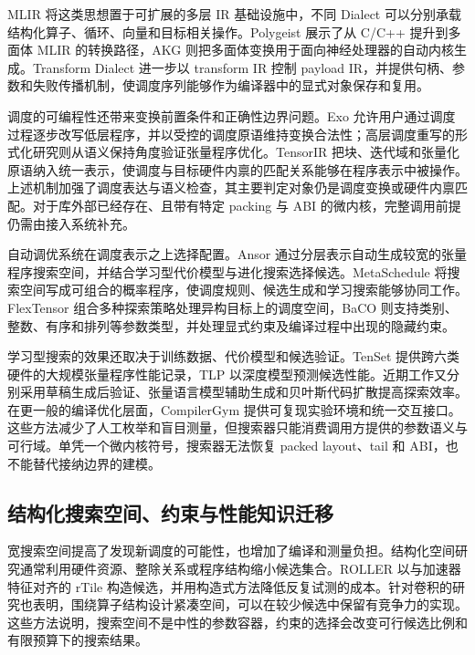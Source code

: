 MLIR 将这类思想置于可扩展的多层 IR 基础设施中，不同 Dialect 可以分别承载结构化算子、循环、向量和目标相关操作\cite{Lattner2021MLIR,Lattner2020MLIR}。Polygeist 展示了从 C/C++ 提升到多面体 MLIR 的转换路径\cite{Moses2021Polygeist}，AKG 则把多面体变换用于面向神经处理器的自动内核生成\cite{Zhao2021AKG}。Transform Dialect 进一步以 transform IR 控制 payload IR，并提供句柄、参数和失败传播机制，使调度序列能够作为编译器中的显式对象保存和复用\cite{LLVMProjectTransformDialect,Luecke2025TransformDialect}。

调度的可编程性还带来变换前置条件和正确性边界问题。Exo 允许用户通过调度过程逐步改写低层程序，并以受控的调度原语维持变换合法性\cite{Ikarashi2022Exocompilation}；高层调度重写的形式化研究则从语义保持角度验证张量程序优化\cite{Liu2022VerifiedScheduling}。TensorIR 把块、迭代域和张量化原语纳入统一表示，使调度与目标硬件内禀的匹配关系能够在程序表示中被操作\cite{Feng2023TensorIR}。上述机制加强了调度表达与语义检查，其主要判定对象仍是调度变换或硬件内禀匹配。对于库外部已经存在、且带有特定 packing 与 ABI 的微内核，完整调用前提仍需由接入系统补充。

自动调优系统在调度表示之上选择配置。Ansor 通过分层表示自动生成较宽的张量程序搜索空间，并结合学习型代价模型与进化搜索选择候选\cite{Zheng2020Ansor}。MetaSchedule 将搜索空间写成可组合的概率程序，使调度规则、候选生成和学习搜索能够协同工作\cite{Shao2022TensorProgram}。FlexTensor 组合多种探索策略处理异构目标上的调度空间\cite{Zheng2020FlexTensor}，BaCO 则支持类别、整数、有序和排列等参数类型，并处理显式约束及编译过程中出现的隐藏约束\cite{Hellsten2023BaCO}。

学习型搜索的效果还取决于训练数据、代价模型和候选验证。TenSet 提供跨六类硬件的大规模张量程序性能记录\cite{Zheng2021TenSet}，TLP 以深度模型预测候选性能\cite{Zhai2023TLP}。近期工作又分别采用草稿生成后验证、张量语言模型辅助生成和贝叶斯代码扩散提高探索效率\cite{Qiao2025Pruner,Zhai2024TLM,Jeong2025BayesianCodeDiffusion}。在更一般的编译优化层面，CompilerGym 提供可复现实验环境和统一交互接口\cite{Cummins2022CompilerGym}。这些方法减少了人工枚举和盲目测量，但搜索器只能消费调用方提供的参数语义与可行域。单凭一个微内核符号，搜索器无法恢复 packed layout、tail 和 ABI，也不能替代接纳边界的建模。

\subsection{结构化搜索空间、约束与性能知识迁移}

宽搜索空间提高了发现新调度的可能性，也增加了编译和测量负担。结构化空间研究通常利用硬件资源、整除关系或程序结构缩小候选集合。ROLLER 以与加速器特征对齐的 rTile 构造候选，并用构造式方法降低反复试测的成本\cite{Zhu2022ROLLER}。针对卷积的研究也表明，围绕算子结构设计紧凑空间，可以在较少候选中保留有竞争力的实现\cite{Tollenaere2023AutotuningConvolutions}。这些方法说明，搜索空间不是中性的参数容器，约束的选择会改变可行候选比例和有限预算下的搜索结果。

